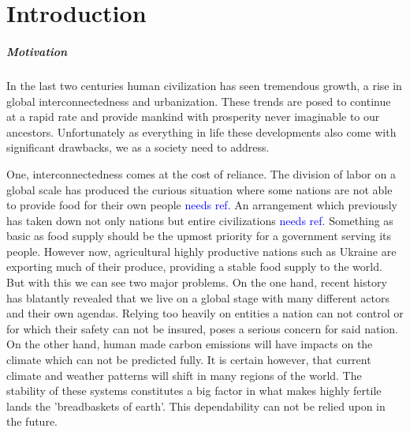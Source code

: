 \chapter{Introduction}
\label{chap:Introduction}


\paragraph{Motivation}
\label{par:Motivation}
In the last two centuries human civilization has seen tremendous growth, a rise in global interconnectedness and urbanization.
These trends are posed to continue at a rapid rate and provide mankind with prosperity never imaginable to our ancestors.
Unfortunately as everything in life these developments also come with significant drawbacks, we as a society need to address.

One, interconnectedness comes at the cost of reliance.
The division of labor on a global scale has produced the curious situation where some nations are not able to provide food for their own people \textcolor{Blue}{needs ref.}
An arrangement which previously has taken down not only nations but entire civilizations \textcolor{Blue}{needs ref}.
Something as basic as food supply should be the upmost priority for a government serving its people.
However now, agricultural highly productive nations such as Ukraine are exporting much of their produce, providing a stable food supply to the world.
But with this we can see two major problems.
On the one hand, recent history has blatantly revealed that we live on a global stage with many different actors and their own agendas.
Relying too heavily on entities a nation can not control or for which their safety can not be insured, poses a serious concern for said nation.
On the other hand, human made carbon emissions will have impacts on the climate which can not be predicted fully.
It is certain however, that current climate and weather patterns will shift in many regions of the world.
The stability of these systems constitutes a big factor in what makes highly fertile lands the 'breadbaskets of earth'.
This dependability can not be relied upon in the future.

